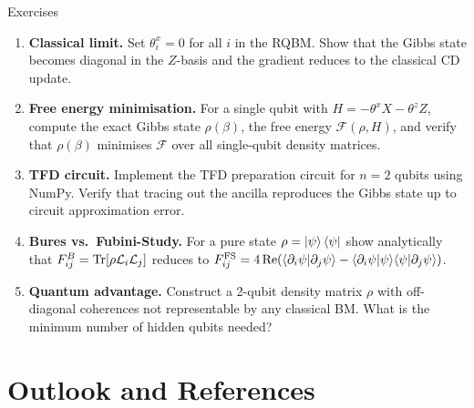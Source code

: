 \documentclass[aspectratio=169,10pt]{beamer}
\begin{document}
\begin{frame}{Exercises}
  \begin{enumerate}\itemsep4pt
    \item \textbf{Classical limit.} Set $\theta_i^x = 0$ for all $i$
          in the RQBM. Show that the Gibbs state becomes diagonal in
          the $Z$-basis and the gradient reduces to the classical CD update.

    \item \textbf{Free energy minimisation.} For a single qubit with
          $H = -\theta^x X - \theta^z Z$, compute the exact Gibbs state
          $\rho(\beta)$, the free energy $\mathcal{F}(\rho,H)$, and verify
          that $\rho(\beta)$ minimises $\mathcal{F}$ over all single-qubit
          density matrices.

    \item \textbf{TFD circuit.} Implement the TFD preparation circuit
          for $n=2$ qubits using NumPy. Verify that tracing out the ancilla
          reproduces the Gibbs state up to circuit approximation error.

    \item \textbf{Bures vs.\ Fubini-Study.} For a pure state
          $\rho = \ket{\psi}\bra{\psi}$ show analytically that
          $F^B_{ij} = \Tr[\rho\mathcal{L}_i\mathcal{L}_j]$ reduces to
          $F^{\rm FS}_{ij} = 4\,\mathrm{Re}(\langle\partial_i\psi|\partial_j\psi\rangle -
          \langle\partial_i\psi|\psi\rangle\langle\psi|\partial_j\psi\rangle)$.

    \item \textbf{Quantum advantage.} Construct a 2-qubit density matrix
          $\rho$ with off-diagonal coherences not representable by any
          classical BM. What is the minimum number of hidden qubits needed?
  \end{enumerate}
\end{frame}

\section{Outlook and References}
\end{document}
